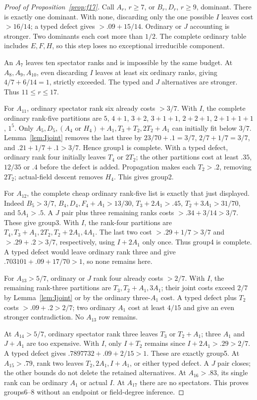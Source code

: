 \documentclass[11pt]{article}
\begin{document}
\begin{proof}[Proof of Proposition~\ref{prop:f17}]
Call $A_r$, $r\ge7$, or $B_r,D_r$, $r\ge9$, dominant.
There is exactly one dominant. With none, discarding only the one
possible $I$ leaves cost $>16/14$; a typed defect gives
$>.09+15/14$. Ordinary or $J$ accounting is stronger.
Two dominants each cost more than $1/2$.
The complete ordinary table includes $E,F,H$, so this step loses no
exceptional irreducible component.

An $A_7$ leaves ten spectator ranks and is impossible by the same
budget. At $A_8,A_9,A_{10}$, even discarding $I$ leaves at least
six ordinary ranks, giving $4/7+6/14=1$, strictly exceeded.
The typed and $J$ alternatives are stronger. Thus $11\le r\le17$.

For $A_{11}$, ordinary spectator rank six already costs $>3/7$.
With $I$, the complete ordinary rank-five partitions are
$5$, $4+1$, $3+2$, $3+1+1$, $2+2+1$, $2+1+1+1$, $1^5$.
Only $A_5,D_5,(A_4\text{ or }H_4)+A_1,T_3+T_2,2T_2+A_1$
can initially fit below $3/7$. Lemma~\ref{lem:Ijoint} removes
the last three by $23/70+.1=3/7$, $2/7+1/7=3/7$, and
$.21+1/7+.1>3/7$. Hence group1 is complete.
With a typed defect, ordinary rank four initially leaves $T_4$ or
$2T_2$; the other partitions cost at least $.35$, $12/35$ or $.4$
before the defect is added. Propagation makes each $T_2>.2$,
removing $2T_2$; actual-field descent removes $H_4$. This gives group2.

For $A_{12}$, the complete cheap ordinary rank-five list is exactly
that just displayed. Indeed $B_5>3/7$,
$B_4,D_4,F_4+A_1>13/30$,
$T_3+2A_1>.45$, $T_2+3A_1>31/70$, and $5A_1>.5$.
A $J$ pair plus three remaining ranks costs $>.34+3/14>3/7$.
These give group3. With $I$, the rank-four partitions are
$T_4,T_3+A_1,2T_2,T_2+2A_1,4A_1$.
The last two cost $>.29+1/7>3/7$ and $>.29+.2>3/7$,
respectively, using $I+2A_1$ only once. Thus group4 is complete.
A typed defect would leave ordinary rank three and give
$.703101+.09+17/70>1$, so none remains here.

For $A_{13}>5/7$, ordinary or $J$ rank four already costs $>2/7$.
With $I$, the remaining rank-three partitions are $T_3,T_2+A_1,3A_1$;
their joint costs exceed $2/7$ by Lemma~\ref{lem:Ijoint} or by
the ordinary three-$A_1$ cost. A typed defect plus $T_2$ costs
$>.09+.2>2/7$; two ordinary $A_1$ cost at least $4/15$ and
give an even stronger contradiction. No $A_{13}$ row remains.

At $A_{14}>5/7$, ordinary spectator rank three leaves $T_3$ or
$T_2+A_1$; three $A_1$ and $J+A_1$ are too expensive.
With $I$, only $I+T_2$ remains since $I+2A_1>.29>2/7$.
A typed defect gives $.7897732+.09+2/15>1$.
These are exactly group5.
At $A_{15}>.79$, rank two leaves $T_2,2A_1,I+A_1$, or either
typed defect. A $J$ pair closes; the other bounds do not delete the
retained alternatives. At $A_{16}>.83$, its single rank can be
ordinary $A_1$ or actual $I$. At $A_{17}$ there are no spectators.
This proves groups6--8 without an endpoint or field-degree inference.


\end{proof}
\end{document}

